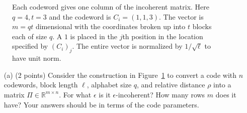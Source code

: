 \documentclass[12pt]{article}
\newcommand{\R}{\mathbb{R}}
\begin{document}
  \begin{figure}[!h]
\begin{center}
\caption{Each codeword gives one column of the incoherent matrix. Here $q = 4, t = 3$ and the codeword is $C_i = (1,1,3)$. The vector is $m = qt$ dimensional with the coordinates broken up into $t$ blocks each of size $q$. A $1$ is placed in the $j$th position in the location specified by $(C_i)_j$. The entire vector is normalized by $1/\sqrt{\ell}$ to have unit norm.}\label{fig:codes}
\end{center}
\end{figure}

\vspace{-.2in}\begin{itemize}
  \item[(a)] (2 points) Consider the construction in Figure~\ref{fig:codes} to convert a code with $n$ codewords, block length $\ell$, alphabet size $q$, and relative distance $\rho$ into a matrix $\Pi\in\R^{m\times n}$. For what $\epsilon$ is it $\epsilon$-incoherent? How many rows $m$ does it have? Your answers should be in terms of the code parameters.
  \end{itemize}
\end{document}

